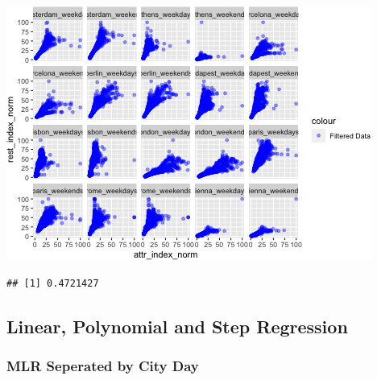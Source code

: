 \documentclass[
]{article}
\newenvironment{Shaded}{\begin{snugshade}}{\end{snugshade}}
\newcommand{\FunctionTok}[1]{\textcolor[rgb]{0.00,0.00,0.00}{#1}}
\newcommand{\NormalTok}[1]{#1}
\newcommand{\SpecialCharTok}[1]{\textcolor[rgb]{0.00,0.00,0.00}{#1}}
\begin{document}
\includegraphics{Project_files/figure-latex/unnamed-chunk-36-4.png}

\begin{Shaded}
\end{Shaded}

\begin{verbatim}
## [1] 0.4721427
\end{verbatim}

\hypertarget{linear-polynomial-and-step-regression}{%
\subsection{Linear, Polynomial and Step
Regression}\label{linear-polynomial-and-step-regression}}

\hypertarget{mlr-seperated-by-city-day}{%
\subsubsection{MLR Seperated by City
Day}\label{mlr-seperated-by-city-day}}
\end{document}
